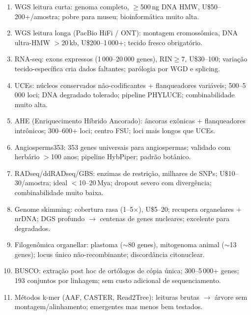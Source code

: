 \clearpage
\begin{revise}\small
\begin{enumerate}[itemsep=0pt, topsep=0pt, parsep=0pt]
    \item WGS leitura curta: genoma completo, $\geq$500\,ng DNA HMW, U\$50--200+/amostra; pobre para museu; bioinformática muito alta.
    \item WGS leitura longa (PacBio HiFi / ONT): montagem cromossômica, DNA ultra-HMW $>$20\,kb, U\$200--1\,000+; tecido fresco obrigatório.
    \item RNA-seq: exons expressos (1\,000--20\,000 genes), RIN$\geq$7, U\$30--100; variação tecido-específica cria dados faltantes; parólogia por WGD e splicing.
    \item UCEs: núcleos conservados não-codificantes + flanqueadores variáveis; 500--5\,000 loci; DNA degradado tolerado; pipeline PHYLUCE; combinabilidade muito alta.
    \item AHE (Enriquecimento Híbrido Ancorado): âncoras exônicas + flanqueadores intrônicos; 300--600+ loci; centro FSU; loci mais longos que UCEs.
    \item Angiosperms353: 353 genes universais para angiospermas; validado com herbário $>$100 anos; pipeline HybPiper; padrão botânico.
    \item RADseq/ddRADseq/GBS: enzimas de restrição, milhares de SNPs; U\$10--30/amostra; ideal $<$10--20\,Mya; dropout severo com divergência; combinabilidade muito baixa.
    \item Genome skimming: cobertura rasa (1--5$\times$), U\$5--20; recupera organelares + nrDNA; DGS profundo $\to$ centenas de genes nucleares; excelente para degradados.
    \item Filogenômica organellar: plastoma ($\sim$80 genes), mitogenoma animal ($\sim$13 genes); locus único não-recombinante; discordância citonuclear.
    \item BUSCO: extração post hoc de ortólogos de cópia única; 300--5\,000+ genes; 193 conjuntos por linhagem; sem custo adicional de sequenciamento.
    \item Métodos k-mer (AAF, CASTER, Read2Tree): leituras brutas $\to$ árvore sem montagem/alinhamento; emergentes mas menos bem testados.
\end{enumerate}
\end{revise}

\clearpage

\printbibliography[heading=subbibliography,title={Referências}]

